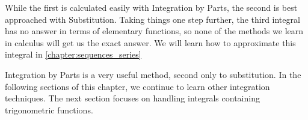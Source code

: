 While the first is calculated easily with Integration by Parts, the second is best approached with Substitution.  Taking things one step further, the third integral has no answer in terms of elementary functions, so none of the methods we learn in calculus will get us the exact answer. We will learn how to approximate this integral in \autoref{chapter:sequences_series}

Integration by Parts is a very useful method, second only to substitution. In the following sections of this chapter, we continue to learn other integration techniques. The next section focuses on handling integrals containing trigonometric functions.




